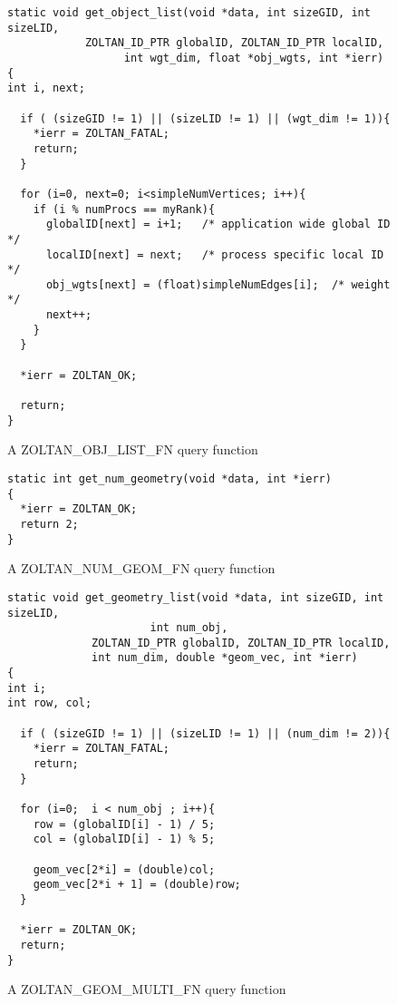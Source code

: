 \begin{figure}
\begin{flushleft}
\begin{verbatim}
static void get_object_list(void *data, int sizeGID, int sizeLID,
            ZOLTAN_ID_PTR globalID, ZOLTAN_ID_PTR localID,
                  int wgt_dim, float *obj_wgts, int *ierr)
{
int i, next;

  if ( (sizeGID != 1) || (sizeLID != 1) || (wgt_dim != 1)){ 
    *ierr = ZOLTAN_FATAL;
    return;
  }

  for (i=0, next=0; i<simpleNumVertices; i++){
    if (i % numProcs == myRank){
      globalID[next] = i+1;   /* application wide global ID */
      localID[next] = next;   /* process specific local ID  */
      obj_wgts[next] = (float)simpleNumEdges[i];  /* weight */
      next++;
    }
  }

  *ierr = ZOLTAN_OK;

  return;
}
\end{verbatim}
\end{flushleft}
\caption{A ZOLTAN\_OBJ\_LIST\_FN query function}
\label{fig:ObjList}
\end{figure}

\begin{figure}
\begin{flushleft}
\begin{verbatim}
static int get_num_geometry(void *data, int *ierr)
{
  *ierr = ZOLTAN_OK;
  return 2;
}
\end{verbatim}
\end{flushleft}
\caption{A ZOLTAN\_NUM\_GEOM\_FN query function}
\label{fig:NumGeom}
\end{figure}

\begin{figure}
\begin{flushleft}
\begin{verbatim}
static void get_geometry_list(void *data, int sizeGID, int sizeLID,
                      int num_obj,
             ZOLTAN_ID_PTR globalID, ZOLTAN_ID_PTR localID,
             int num_dim, double *geom_vec, int *ierr)
{
int i;
int row, col;
   
  if ( (sizeGID != 1) || (sizeLID != 1) || (num_dim != 2)){
    *ierr = ZOLTAN_FATAL; 
    return;
  }
    
  for (i=0;  i < num_obj ; i++){
    row = (globalID[i] - 1) / 5;
    col = (globalID[i] - 1) % 5;
  
    geom_vec[2*i] = (double)col;
    geom_vec[2*i + 1] = (double)row;
  }

  *ierr = ZOLTAN_OK;
  return;
} 
\end{verbatim}
\end{flushleft}
\caption{A ZOLTAN\_GEOM\_MULTI\_FN query function}
\label{fig:GeomMulti}
\end{figure}

